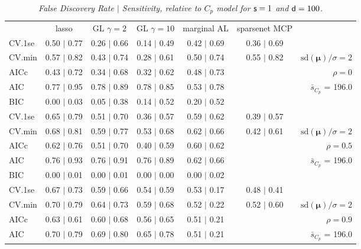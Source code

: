 \documentclass[12pt]{article}
\newcommand{\mr}[1]{\mathrm{#1}}
\newcommand{\bm}[1]{\mathbf{#1}}
\begin{document}
\begin{table}[p]\vspace{-.5cm}
\caption[l]{\label{sens}\it False Discovery Rate $\mid$ Sensitivity, relative to $C_p$ model  for ${\sf s}=1$ and ${\sf d}=100$.}
\vspace{-.5cm}
\small{}
\begin{center}
\begin{tabular}{l*{5}{c}|r}
 & lasso & GL $\gamma=2$ & GL $\gamma=10$ & marginal AL & sparsenet MCP  & \\
 \cline{1-7}
CV.1se & 0.50 $\mid$ 0.77 & 0.26 $\mid$ 0.66 & 0.14 $\mid$ 0.49 & 0.42 $\mid$ 0.69 & 0.36 $\mid$ 0.69 &\\
CV.min & 0.57 $\mid$ 0.82 & 0.43 $\mid$ 0.74 & 0.28 $\mid$ 0.61 & 0.50 $\mid$ 0.74 & 0.55 $\mid$ 0.82 &  $\mr{sd}(\bm{\mu})/\sigma=2$ \\
AICc & 0.43 $\mid$ 0.72 & 0.34 $\mid$ 0.68 & 0.32 $\mid$ 0.62 & 0.48 $\mid$ 0.73 & & $\rho=0$ \\
AIC & 0.77 $\mid$ 0.95 & 0.78 $\mid$ 0.89 & 0.78 $\mid$ 0.85 & 0.53 $\mid$ 0.78 & & \multirow{2}{*}{$\bar{s}_{C_p}$ = 196.0} \\
BIC & 0.00 $\mid$ 0.03 & 0.05 $\mid$ 0.38 & 0.14 $\mid$ 0.52 & 0.20 $\mid$ 0.52 & & \\
 \hline 
CV.1se & 0.65 $\mid$ 0.79 & 0.51 $\mid$ 0.70 & 0.36 $\mid$ 0.57 & 0.59 $\mid$ 0.62 & 0.39 $\mid$ 0.57 &\\
CV.min & 0.68 $\mid$ 0.81 & 0.59 $\mid$ 0.77 & 0.53 $\mid$ 0.68 & 0.62 $\mid$ 0.66 & 0.42 $\mid$ 0.61 &  $\mr{sd}(\bm{\mu})/\sigma=2$ \\
AICc & 0.62 $\mid$ 0.76 & 0.51 $\mid$ 0.70 & 0.40 $\mid$ 0.59 & 0.60 $\mid$ 0.62 & & $\rho=0.5$ \\
AIC & 0.76 $\mid$ 0.93 & 0.76 $\mid$ 0.91 & 0.76 $\mid$ 0.89 & 0.62 $\mid$ 0.66 & & \multirow{2}{*}{$\bar{s}_{C_p}$ = 196.0} \\
BIC & 0.00 $\mid$ 0.01 & 0.00 $\mid$ 0.01 & 0.00 $\mid$ 0.00 & 0.00 $\mid$ 0.02 & & \\
 \hline 
CV.1se & 0.67 $\mid$ 0.73 & 0.59 $\mid$ 0.66 & 0.54 $\mid$ 0.59 & 0.53 $\mid$ 0.17 & 0.48 $\mid$ 0.41 &\\
CV.min & 0.70 $\mid$ 0.79 & 0.64 $\mid$ 0.73 & 0.59 $\mid$ 0.68 & 0.52 $\mid$ 0.22 & 0.52 $\mid$ 0.60 &  $\mr{sd}(\bm{\mu})/\sigma=2$ \\
AICc & 0.63 $\mid$ 0.61 & 0.60 $\mid$ 0.68 & 0.56 $\mid$ 0.65 & 0.51 $\mid$ 0.21 & & $\rho=0.9$ \\
AIC & 0.70 $\mid$ 0.79 & 0.69 $\mid$ 0.80 & 0.65 $\mid$ 0.78 & 0.51 $\mid$ 0.21 & & \multirow{2}{*}{$\bar{s}_{C_p}$ = 196.0} \\

\end{tabular}
\end{center}
\end{table}
\end{document}
